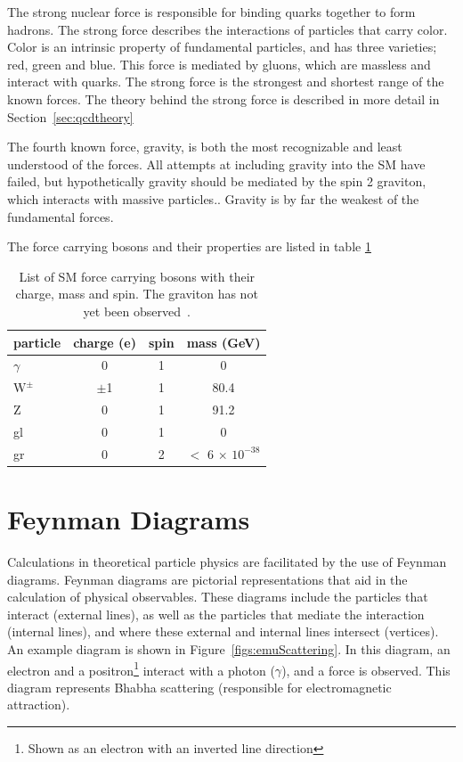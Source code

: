 The strong nuclear force is responsible for binding quarks together to form hadrons.  
The strong force describes the interactions of particles that carry color.  
Color is an intrinsic property of fundamental particles, and has three varieties; red, green and blue.
This force is mediated by gluons, which are massless and interact with quarks.  
The strong force is the strongest and shortest range of the known forces.  
The theory behind the strong force is described in more detail in Section~\ref{sec:qcdtheory}

The fourth known force, gravity, is both the most recognizable and least understood of the forces.  
All attempts at including gravity into the SM have failed, but hypothetically gravity should be mediated by the spin 2 graviton, which interacts with massive particles..
Gravity is by far the weakest of the fundamental forces. 

The force carrying bosons and their properties are listed in table \ref{table:SMbos}


\begin{table}
\begin{center}
\begin{tabular}{l|c|c|c}
\hline
\hline
particle & charge (e) & spin & mass (GeV)\\ \hline \hline
$\gamma$  & 0 & 1 & 0\\ 
$\mathrm{W^{\pm}}$ & $\pm$1 & 1 & 80.4\\
Z & 0 & 1 & 91.2\\ 
gl & 0 & 1 & 0 \\ 
gr & 0 & 2 & $<$ 6 $\times$ $\mathrm{10^{-38}}$ \\ 
\hline
\end{tabular}
\end{center}
\caption{List of SM force carrying bosons with their charge, mass and spin.  The graviton has not yet been observed~\cite{PDG-2014}.}
\label{table:SMbos}
\end{table}


\section{Feynman Diagrams}
Calculations in theoretical particle physics are facilitated by the use of Feynman diagrams.  
Feynman diagrams are pictorial representations that aid in the calculation of physical observables.  
These diagrams include the particles that interact (external lines), as well as the particles that mediate the interaction (internal lines), 
and where these external and internal lines intersect (vertices).  
An example diagram is shown in Figure~\ref{figs:emuScattering}.  
In this diagram, an electron and a positron\footnote{Shown as an electron with an inverted line direction} interact with a photon ($\gamma$), and a force is observed.
This diagram represents Bhabha scattering (responsible for electromagnetic attraction).  

